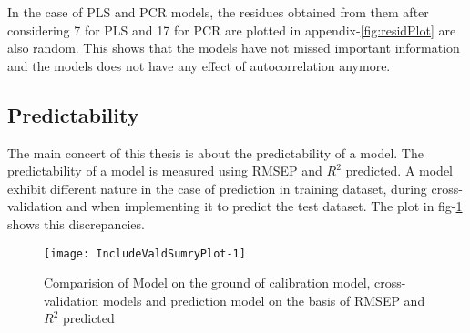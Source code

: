 \documentclass[12pt, lot, lof]{thesis}\usepackage[]{graphicx}\usepackage[]{color}
\makeatletter
\def\maxwidth{ %
  \ifdim\Gin@nat@width>\linewidth
    \linewidth
  \else
    \Gin@nat@width
  \fi
}
\makeatother
\begin{document}
In the case of PLS and PCR models, the residues obtained from them after considering 7 for PLS and 17 for PCR are plotted in appendix-\ref{fig:residPlot} are also random. This shows that the models have not missed important information and the models does not have any effect of autocorrelation anymore.

\subsection{Predictability}
\label{ssec:prdblty}
The main concert of this thesis is about the predictability of a model. The predictability of a model is measured using RMSEP and $R^2$ predicted. A model exhibit different nature in the case of prediction in training dataset, during cross-validation and when implementing it to predict the test dataset. The plot in fig-\ref{fig:ValdSumryPlot} shows this discrepancies.


\begin{Schunk}
\begin{figure}

{\centering \texttt{[image: IncludeValdSumryPlot-1]} 

}

\caption[Comparision of Model on the ground of calibration model, cross-validation models and prediction model on the basis of RMSEP and ]{Comparision of Model on the ground of calibration model, cross-validation models and prediction model on the basis of RMSEP and $R^2$ predicted\label{fig:ValdSumryPlot}}
\end{figure}
\end{Schunk}
\end{document}
